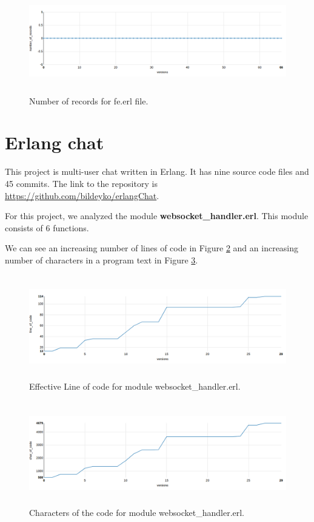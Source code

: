 \begin{figure}[ht]
	\centering
	\includegraphics[height=45mm]{figures/number_of_records_iron.png}
	\caption{Number of records for fe.erl file.}
	\label{fig:number_of_records_iron}
\end{figure}

\section{Erlang chat }

This project is multi-user chat written in Erlang. It has nine source code files and 45 commits. The link to the repository is \url{https://github.com/bildeyko/erlangChat}.

For this project, we analyzed the module \textbf{websocket\_handler.erl}. This module consists of 6 functions.

We can see an increasing number of lines of code in Figure \ref{fig:loc_chat} and an increasing number of characters in a program text in Figure \ref{fig:char_of_code_chat}.

\begin{figure}[ht]
	\centering
	\includegraphics[height=45mm]{figures/loc_chat.png}
	\caption{Effective Line of code for module websocket\_handler.erl.}
	\label{fig:loc_chat}
\end{figure}

\begin{figure}[ht]
	\centering
	\includegraphics[height=45mm]{figures/char_of_code_chat.png}
	\caption{Characters of the code for module websocket\_handler.erl.}
	\label{fig:char_of_code_chat}
\end{figure}

